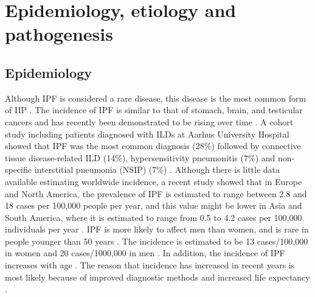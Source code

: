 \section{Epidemiology, etiology and pathogenesis} 
\subsection{Epidemiology}
Although IPF is considered a rare disease, this disease is the most common form of IIP \citep{travis2013official}. The incidence of IPF is similar to that of stomach, brain, and testicular cancers and has recently been demonstrated to be rising over time \citep{richeldi2017idiopathic}. A cohort study including patients diagnosed with ILDs at Aarhus University Hospital showed that IPF was the most common diagnosis (28\%) followed by connective tissue disease-related ILD (14\%), hypersensitivity pneumonitis (7\%) and non-specific interstitial pneumonia (NSIP) (7\%) \citep{hyldgaard2014cohort}. Although there is little data available estimating worldwide incidence, a recent study showed that in Europe and North America, the prevalence of IPF is estimated to range between 2.8 and 18 cases per 100,000 people per year, and this value might be lower in Asia and South America, where it is estimated to range from 0.5 to 4.2 cases per 100,000 individuals per year \citep{richeldi2017idiopathic}. IPF is more likely to affect men than women, and is rare in people younger than 50 years \citep{raghu2011official, raghu2006incidence}. The incidence is estimated to be 13 cases/100,000 in women and 20 cases/1000,000 in men \citep{xaubet2017idiopathic}. In addition, the incidence of IPF increases with age \citep{meltzer2008idiopathic}. The reason that incidence has increased in recent years is most likely because of improved diagnostic methods and increased life expectancy \citep{xaubet2017idiopathic}.

